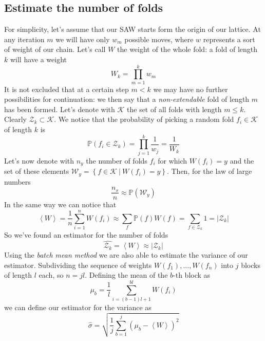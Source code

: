 \subsection{Estimate the number of folds}
For simplicity, let's assume that our SAW starts form the origin of our lattice.
At any iteration $m$ we will have only $w_m$ possible moves, where $w$ represents a sort of weight of our chain.
Let's call $W$ the weight of the whole fold: a fold of length $k$ will have a weight
\begin{equation*}
    W_k = \prod_{m=1}^k w_m
\end{equation*}
It is not excluded that at a certain step $m < k$ we may have no further possibilities for continuation: we then say that a \emph{non-extendable} fold of length $m$ has been formed.
Let's denote with $\mathcal{K}$ the set of all folds with length $m \leq k$.
Clearly $\mathcal{Z}_k \subset \mathcal{K}$.
We notice that the probability of picking a random fold $f_i \in \mathcal{K}$ of length $k$ is
\begin{equation*}
    \mathbb{P}\left(f_i \in \mathcal{Z}_k\right) = \prod_{j=1}^k \frac{1}{w_j} = \frac{1}{W_k}
\end{equation*}
Let's now denote with $n_y$ the number of folds $f_i$ for which $W\left(f_i\right) = y$ and the set of these elements $\mathcal{W}_y = \left\{f \in \mathcal{K} \ | \ W\left(f_i\right) = y\right\}$.
Then, for the law of large numbers
\begin{equation*}
    \frac{n_s}{n} \approx \mathbb{P}\left(\mathcal{W}_y\right)
\end{equation*}
In the same way we can notice that
\begin{equation*}
    \left\langle W \right\rangle = \frac{1}{n} \sum_{i=1}^n W\left(f_i\right) \approx \sum_f \mathbb{P}\left(f\right)W\left(f\right) = \sum_{f \in \mathcal{Z}_k} 1 = \left\lvert \mathcal{Z}_k \right\rvert
\end{equation*}
So we've found an estimator for the number of folds
\begin{equation}
    \hat{\mathcal{Z}_k} = \left\langle W \right\rangle \approx \left\lvert \mathcal{Z}_k \right\rvert
\end{equation}
Using the \emph{batch mean method} we are also able to estimate the variance of our estimator.
Subdividing the sequence of weights $W\left(f_1\right),\ldots,W\left(f_n\right)$ into $j$ blocks of length $l$ each, so $n = jl$.
Defining the mean of the $b$-th block as
\begin{equation*}
    \mu_b = \frac{1}{l} \sum_{i = (b-1)l + 1}^{bl} W\left(f_i\right)
\end{equation*}
we can define our estimator for the variance as
\begin{equation}
    \hat{\sigma} = \sqrt{\frac{1}{j} \sum_{b = 1}^j \left(\mu_b - \left\langle W \right\rangle\right)^2}
\end{equation}